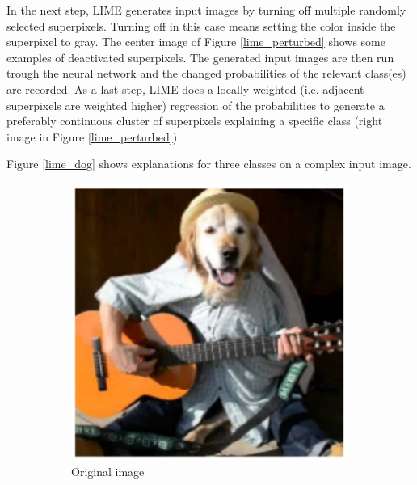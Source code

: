 In the next step, LIME generates input images by turning off multiple randomly selected superpixels. Turning off in this case means setting the color inside the superpixel to gray. The center image of Figure \ref{lime_perturbed} shows some examples of deactivated superpixels. The generated input images are then run trough the neural network and the changed probabilities of the relevant class(es) are recorded. As a last step, LIME does a locally weighted (i.e. adjacent superpixels are weighted higher) regression of the probabilities to generate a preferably continuous cluster of superpixels explaining a specific class (right image in Figure \ref{lime_perturbed}).

Figure \ref{lime_dog} shows explanations for three classes on a complex input image.

\begin{figure}[H]
    \centering
    \begin{subfigure}[t]{.23\textwidth}
        \centering
        \includegraphics[width=\linewidth]{chapters/02_methods/images/lime_dog_1.png}
        \caption{Original image}
    \end{subfigure}\hfill%
    \begin{subfigure}[t]{.23\textwidth}
        \centering

\end{subfigure}
\end{figure}
